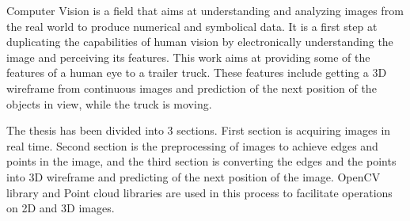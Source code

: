 
Computer Vision is a field that aims at understanding and analyzing images from the real world to produce numerical and symbolical data. 
It is a first step at duplicating the capabilities of human vision by electronically understanding the image and perceiving its features. 
This work aims at providing some of the features of a human eye to a trailer truck. These features include getting a 3D wireframe from continuous images and prediction of the next position of the objects in view, while the truck is moving. 

The thesis has been divided into 3 sections. First section is acquiring images in real time. Second section is the preprocessing of images to achieve edges and points in the image, and the third section is converting the edges and the points into  3D wireframe and predicting of the next position of the image. 
OpenCV library and Point cloud libraries are used in this process to facilitate operations on 2D and 3D images. 

